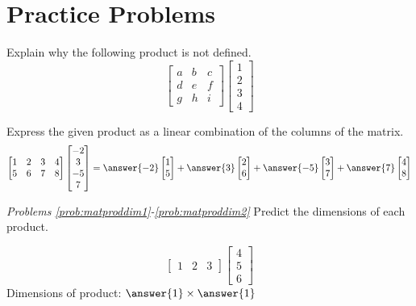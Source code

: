 \documentclass{ximera}
\begin{document}
\section*{Practice Problems}

\begin{problem}\label{prob:matprodundefined} Explain why the following product is not defined.
$$\begin{bmatrix}a&b&c\\d&e&f\\g&h&i\end{bmatrix}\begin{bmatrix}1\\2\\3\\4\end{bmatrix}$$
\end{problem}

\begin{problem}\label{prob:lincombcols}
Express the given product as a linear combination of the columns of the matrix.
$$\begin{bmatrix}1&2&3&4\\5&6&7&8\end{bmatrix}\begin{bmatrix}-2\\3\\-5\\7\end{bmatrix}=\answer{-2}\begin{bmatrix}1\\5\end{bmatrix}+\answer{3}\begin{bmatrix}2\\6\end{bmatrix}+\answer{-5}\begin{bmatrix}3\\7\end{bmatrix}+\answer{7}\begin{bmatrix}4\\8\end{bmatrix}$$
\end{problem}

\emph{Problems \ref{prob:matproddim1}-\ref{prob:matproddim2}}
Predict the dimensions of each product.

\begin{problem}\label{prob:matproddim1}
$$\begin{bmatrix}1&2&3\end{bmatrix}\begin{bmatrix}4\\5\\6\end{bmatrix}$$
Dimensions of product: $\answer{1}\times \answer{1}$
\end{problem}
\end{document}
